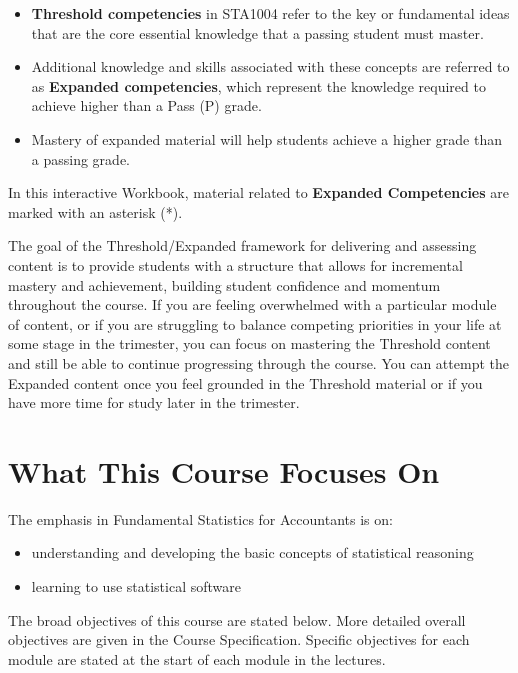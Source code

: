 \documentclass[
  11pt,
  oneside]{scrbook}
\providecommand{\tightlist}{%
  \setlength{\itemsep}{0pt}\setlength{\parskip}{0pt}}
\begin{document}
\begin{itemize}
\item
  \textbf{Threshold competencies} in STA1004 refer to the key or fundamental ideas that are the core essential knowledge that a passing student must master.
\item
  Additional knowledge and skills associated with these concepts are referred to as \textbf{Expanded competencies}, which represent the knowledge required to achieve higher than a Pass (P) grade.
\item
  Mastery of expanded material will help students achieve a higher grade than a passing grade.
\end{itemize}

In this interactive Workbook, material related to \textbf{Expanded Competencies} are marked with an asterisk (*).

The goal of the Threshold/Expanded framework for delivering and assessing content is to provide students with a structure that allows for incremental mastery and achievement, building student confidence and momentum throughout the course. If you are feeling overwhelmed with a particular module of content, or if you are struggling to balance competing priorities in your life at some stage in the trimester, you can focus on mastering the Threshold content and still be able to continue progressing through the course. You can attempt the Expanded content once you feel grounded in the Threshold material or if you have more time for study later in the trimester.

\section*{What This Course Focuses On}\label{what-this-course-focuses-on}

The emphasis in Fundamental Statistics for Accountants is on:

\begin{itemize}
\tightlist
\item
  understanding and developing the basic concepts of statistical reasoning\\
\item
  learning to use statistical software
\end{itemize}

The broad objectives of this course are stated below. More detailed overall objectives
are given in the Course Specification. Specific objectives for each module are stated
at the start of each module in the lectures.
\end{document}

